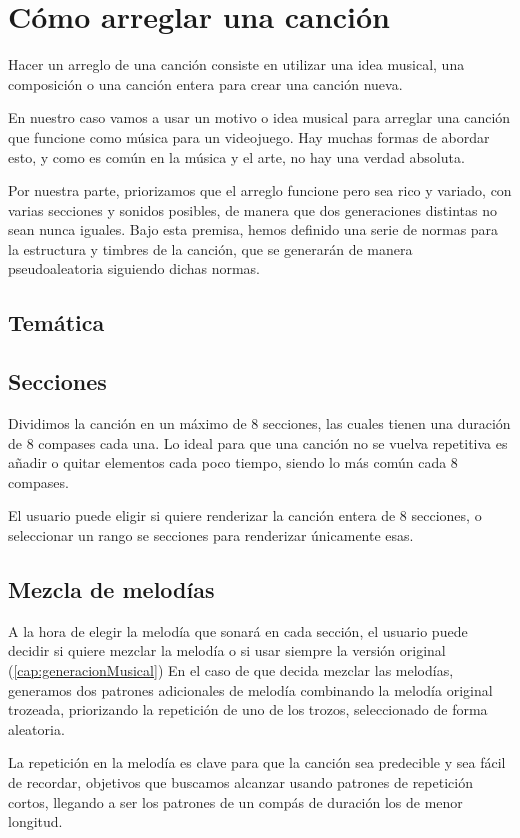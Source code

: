\chapter{Cómo arreglar una canción}
Hacer un arreglo de una canción consiste en utilizar una idea musical, una composición o una canción entera para crear una canción nueva.

En nuestro caso vamos a usar un motivo o idea musical para arreglar una canción que funcione como música para un videojuego. Hay muchas formas de abordar esto, y como es común en la música y el arte, no hay una verdad absoluta.

Por nuestra parte, priorizamos que el arreglo funcione pero sea rico y variado, con varias secciones y sonidos posibles, de manera que dos generaciones distintas no sean nunca iguales. Bajo esta premisa, hemos definido una serie de normas para la estructura y timbres de la canción, que se generarán de manera pseudoaleatoria siguiendo dichas normas.

\section{Temática}
\label{sec:tematica}

\section{Secciones}

Dividimos la canción en un máximo de 8 secciones, las cuales tienen una duración de 8 compases cada una. Lo ideal para que una canción no se vuelva repetitiva es añadir o quitar elementos cada poco tiempo, siendo lo más común cada 8 compases.

El usuario puede eligir si quiere renderizar la canción entera de 8 secciones, o seleccionar un rango se secciones para renderizar únicamente esas.

\section{Mezcla de melodías}
A la hora de elegir la melodía que sonará en cada sección, el usuario puede decidir si quiere mezclar la melodía o si usar siempre la versión original (\ref{cap:generacionMusical})
En el caso de que decida mezclar las melodías, generamos dos patrones adicionales de melodía combinando la melodía original trozeada, priorizando la repetición de uno de los trozos, seleccionado de forma aleatoria.

La repetición en la melodía es clave para que la canción sea predecible y sea fácil de recordar, objetivos que buscamos alcanzar usando patrones de repetición cortos, llegando a ser los patrones de un compás de duración los de menor longitud.

